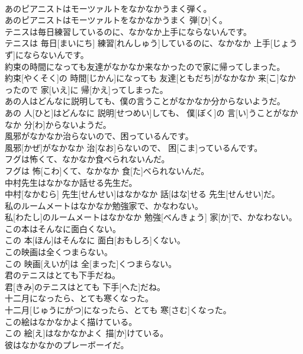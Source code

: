 \documentclass[8pt]{extreport}
\begin{document}
\begin{CJK}{UTF8}{min}
\\	あのピアニストはモーツァルトをなかなかうまく弾く。	
\\	あのピアニストはモーツァルトをなかなかうまく 弾[ひ]く。
\\	テニスは毎日練習しているのに、なかなか上手にならないんです。	
\\	テニスは 毎日[まいにち] 練習[れんしゅう]しているのに、なかなか 上手[じょうず]にならないんです。
\\	約束の時間になっても友達がなかなか来なかったので家に帰ってしまった。	
\\	約束[やくそく]の 時間[じかん]になっても 友達[ともだち]がなかなか 来[こ]なかったので 家[いえ]に 帰[かえ]ってしまった。
\\	あの人はどんなに説明しても、僕の言うことがなかなか分からないようだ。	
\\	あの 人[ひと]はどんなに 説明[せつめい]しても、 僕[ぼく]の 言[い]うことがなかなか 分[わ]からないようだ。
\\	風邪がなかなか治らないので、困っているんです。	
\\	風邪[かぜ]がなかなか 治[なお]らないので、 困[こま]っているんです。
\\	フグは怖くて、なかなか食べられないんだ。	
\\	フグは 怖[こわ]くて、なかなか 食[た]べられないんだ。
\\	中村先生はなかなか話せる先生だ。	
\\	中村[なかむら] 先生[せんせい]はなかなか 話[はな]せる 先生[せんせい]だ。
\\	私のルームメートはなかなか勉強家で、かなわない。	
\\	私[わたし]のルームメートはなかなか 勉強[べんきょう] 家[か]で、かなわない。
\\	この本はそんなに面白くない。	
\\	この 本[ほん]はそんなに 面白[おもしろ]くない。
\\	この映画は全くつまらない。	
\\	この 映画[えいが]は 全[まった]くつまらない。
\\	君のテニスはとても下手だね。	
\\	君[きみ]のテニスはとても 下手[へた]だね。
\\	十二月になったら、とても寒くなった。	
\\	十二月[じゅうにがつ]になったら、とても 寒[さむ]くなった。
\\	この絵はなかなかよく描けている。	
\\	この 絵[え]はなかなかよく 描[か]けている。
\\	彼はなかなかのプレーボーイだ。	

\end{CJK}
\end{document}
